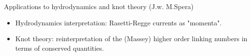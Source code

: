 \documentclass[handout,10pt]{beamer}
\begin{document}
\begin{frame}[t]{Applications to hydrodynamics and knot theory \small(J.w. M.Spera)}
		\pause
		\vfill
		\begin{itemize}[<+->]%
			\item[\CheckedBox]  Hydrodynamics interpretation: Rasetti-Regge currents as "momenta".
			\item[\CheckedBox]  Knot theory: reinterpretation of the (Massey) higher order linking numbers in terms of conserved quantities.
		\end{itemize}
	\end{frame}





\end{document}
